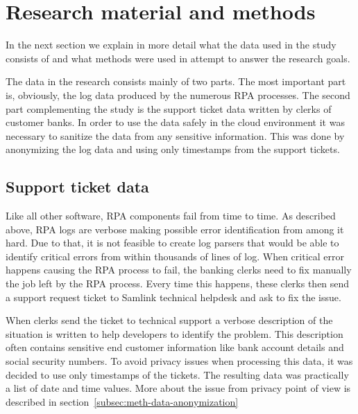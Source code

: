 

\section{Research material and methods}\label{sec:research-material-and-methods}

In the next section
we explain in more detail
what the data used in the study
consists of
and what methods were used
in attempt to answer the research goals.

The data in the research consists mainly of two parts.
The most important part is, obviously,
the log data produced by the numerous RPA processes.
The second part complementing the study
is the support ticket data written by clerks of customer banks.
In order to use the data safely in the cloud environment
it was necessary to sanitize the data
from any sensitive information.
This was done by anonymizing the log data
and using only timestamps from the support tickets.

\subsection{Support ticket data}\label{subsec:meth-efecte-ticket-data}

Like all other software,
RPA components fail from time to time.
As described above, %
RPA logs are verbose
making possible error identification from among it hard.
Due to that,
it is not feasible to create log parsers
that would be able to identify critical errors
from within thousands of lines of log.
When critical error happens
causing the RPA process to fail,
the banking clerks need to fix manually
the job left by the RPA process.
Every time this happens,
these clerks then send a support request ticket
to Samlink technical helpdesk
and ask to fix the issue.


When clerks send the ticket to technical support
a verbose description of the situation is written
to help developers to identify the problem.
This description often contains sensitive end customer information
like bank account details and social security numbers.
To avoid privacy issues when processing this data,
it was decided to use only timestamps of the tickets.
The resulting data was practically a list of date and time values.
More about the issue from privacy point of view
is described in section~\ref{subsec:meth-data-anonymization}


